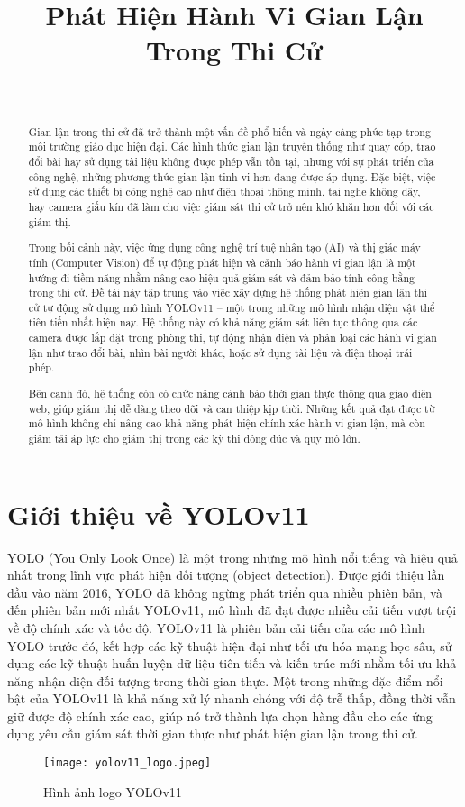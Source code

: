 \documentclass[conference]{IEEEtran}
\title{Phát Hiện Hành Vi Gian Lận Trong Thi Cử}
\author{
    \IEEEauthorblockN{Trần Ngọc Duyên, Phạm Thị Huyền Trang, Nguyễn Trọng Anh, Nguyễn Anh Dũng, Trương Văn An}
    \IEEEauthorblockA{
        CNTT16-05 Nhóm 9, Khoa Công Nghệ Thông Tin\\
        Trường Đại Học Đại Nam, Việt Nam
    }
    \\
    \IEEEauthorblockN{\textbf{ThS. Nguyễn Văn Nhân, ThS. Lê Trung Hiếu}}
    \IEEEauthorblockA{
        Giảng viên hướng dẫn, Khoa Công Nghệ Thông Tin\\
        Trường Đại Học Đại Nam, Việt Nam
    }
}
\begin{document}
\maketitle

\begin{abstract}
Gian lận trong thi cử đã trở thành một vấn đề phổ biến và ngày càng phức tạp trong môi trường giáo dục hiện đại. Các hình thức gian lận truyền thống như quay cóp, trao đổi bài hay sử dụng tài liệu không được phép vẫn tồn tại, nhưng với sự phát triển của công nghệ, những phương thức gian lận tinh vi hơn đang được áp dụng. Đặc biệt, việc sử dụng các thiết bị công nghệ cao như điện thoại thông minh, tai nghe không dây, hay camera giấu kín đã làm cho việc giám sát thi cử trở nên khó khăn hơn đối với các giám thị.

Trong bối cảnh này, việc ứng dụng công nghệ trí tuệ nhân tạo (AI) và thị giác máy tính (Computer Vision) để tự động phát hiện và cảnh báo hành vi gian lận là một hướng đi tiềm năng nhằm nâng cao hiệu quả giám sát và đảm bảo tính công bằng trong thi cử. Đề tài này tập trung vào việc xây dựng hệ thống phát hiện gian lận thi cử tự động sử dụng mô hình YOLOv11 – một trong những mô hình nhận diện vật thể tiên tiến nhất hiện nay. Hệ thống này có khả năng giám sát liên tục thông qua các camera được lắp đặt trong phòng thi, tự động nhận diện và phân loại các hành vi gian lận như trao đổi bài, nhìn bài người khác, hoặc sử dụng tài liệu và điện thoại trái phép.

Bên cạnh đó, hệ thống còn có chức năng cảnh báo thời gian thực thông qua giao diện web, giúp giám thị dễ dàng theo dõi và can thiệp kịp thời. Những kết quả đạt được từ mô hình không chỉ nâng cao khả năng phát hiện chính xác hành vi gian lận, mà còn giảm tải áp lực cho giám thị trong các kỳ thi đông đúc và quy mô lớn.
\end{abstract}
\section{Giới thiệu về YOLOv11}
YOLO (You Only Look Once) là một trong những mô hình nổi tiếng và hiệu quả nhất trong lĩnh vực phát hiện đối tượng (object detection). Được giới thiệu lần đầu vào năm 2016, YOLO đã không ngừng phát triển qua nhiều phiên bản, và đến phiên bản mới nhất YOLOv11, mô hình đã đạt được nhiều cải tiến vượt trội về độ chính xác và tốc độ.
YOLOv11 là phiên bản cải tiến của các mô hình YOLO trước đó, kết hợp các kỹ thuật hiện đại như tối ưu hóa mạng học sâu, sử dụng các kỹ thuật huấn luyện dữ liệu tiên tiến và kiến trúc mới nhằm tối ưu khả năng nhận diện đối tượng trong thời gian thực. Một trong những đặc điểm nổi bật của YOLOv11 là khả năng xử lý nhanh chóng với độ trễ thấp, đồng thời vẫn giữ được độ chính xác cao, giúp nó trở thành lựa chọn hàng đầu cho các ứng dụng yêu cầu giám sát thời gian thực như phát hiện gian lận trong thi cử.
\begin{figure}[h]
    \centering
    \texttt{[image: yolov11\_logo.jpeg]}
    \caption{Hình ảnh logo YOLOv11}
    \label{fig:yolov11_architecture}
\end{figure}
\end{document}
